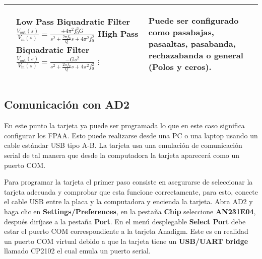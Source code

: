 \begin{table}[!ht]
\begin{tabular}{>{\centering\arraybackslash}m{3cm} >{\centering\arraybackslash}m{5cm} >{\centering\arraybackslash}m{5cm}}
	    &
	      \begin{scriptsize}
			 \textbf{Low Pass Biquadratic Filter} \linebreak
	      	 $\frac{V_{\mathrm{out}}(s)}{V_{\mathrm{in}}(s)} = \frac{\pm 4 \pi^{2} f_{0}^{2} G}{s^{2} + \frac{2 \pi f_{0}}{Q}s + 4 \pi^{2} f_{0}^{2}}$ \linebreak
	      	 \textbf{High Pass Biquadratic Filter} \linebreak
	      	 $\frac{V_{\mathrm{out}}(s)}{V_{\mathrm{in}}(s)} = \frac{-G s^{2}}{s^{2} + \frac{2 \pi f_{0}}{Q} s + 4 \pi^{2} f_{0}^{2}}$ \linebreak
	      	 $\vdots$
	      \end{scriptsize}
	    & 
	      \begin{itemize}[leftmargin=0cm,noitemsep]
	      \begin{scriptsize}
			\item[] Puede ser configurado como pasabajas, pasaaltas, pasabanda, rechazabanda o general (Polos y ceros).
	      \end{scriptsize}
	      \end{itemize}
	    \\ %
	    \hline
	  \end{tabular}
	\end{table}
	
		\subsection{Comunicación con AD2}\label{sec:comunicacion_con_AD2}

	En este punto la tarjeta ya puede ser programada lo que en este caso significa configurar los FPAA. Esto puede realizarse desde una PC o una laptop usando un cable estándar USB tipo A-B. La tarjeta usa una emulación de comunicación serial de tal manera que desde la computadora la tarjeta aparecerá como un puerto COM.

	Para programar la tarjeta el primer paso consiste en asegurarse de seleccionar la tarjeta adecuada y comprobar que esta funcione correctamente, para esto, conecte el cable USB entre la placa y la computadora y encienda la tarjeta. Abra AD2 y haga clic en \textbf{Settings/Preferences}, en la pestaña \textbf{Chip} seleccione \textbf{AN231E04}, después diríjase a la pestaña \textbf{Port}. En el menú desplegable \textbf{Select Port} debe estar el puerto COM correspondiente a la tarjeta Anadigm. Este es en realidad un puerto COM virtual debido a que la tarjeta tiene un \textbf{USB/UART bridge} llamado CP2102 el cual emula un puerto serial. 

